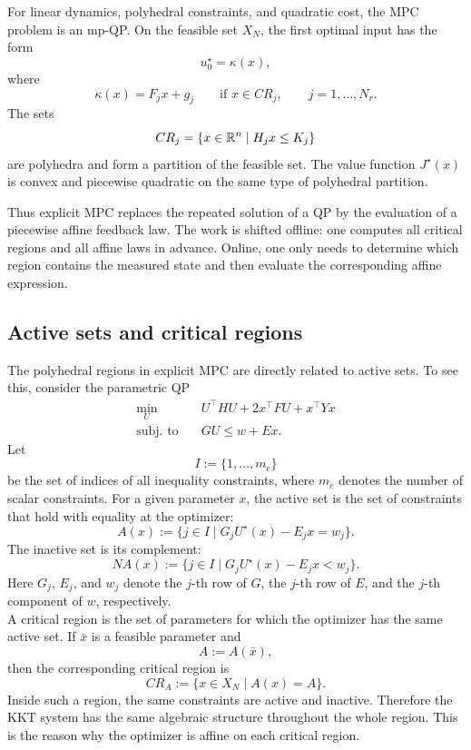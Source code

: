 \begin{theorembox}
For linear dynamics, polyhedral constraints, and quadratic cost, the MPC problem is an mp-QP.
On the feasible set \(X_N\), the first optimal input has the form
\[
    u_0^\star = \kappa(x),
\]
where
\[
    \kappa(x)=F_jx+g_j
    \qquad \text{if } x\in CR_j,
    \qquad j=1,\ldots,N_r .
\]
The sets
\[
    CR_j=\{x\in\mathbb{R}^n\mid H_jx\leq K_j\}
\]
are polyhedra and form a partition of the feasible set. The value function \(J^\star(x)\) is
convex and piecewise quadratic on the same type of polyhedral partition.
\end{theorembox}

Thus explicit MPC replaces the repeated solution of a QP by the evaluation of a piecewise affine
feedback law. The work is shifted offline: one computes all critical regions and all affine laws in
advance. Online, one only needs to determine which region contains the measured state and then
evaluate the corresponding affine expression.

\subsection{Active sets and critical regions}

The polyhedral regions in explicit MPC are directly related to active sets. To see this, consider
the parametric QP
\[
\begin{aligned}
    \min_U \quad
    & U^\top H U + 2x^\top F U + x^\top Yx
    \\
    \text{subj. to}\quad
    & GU \leq w + Ex.
\end{aligned}
\]
Let
\[
    I:=\{1,\ldots,m_c\}
\]
be the set of indices of all inequality constraints, where \(m_c\) denotes the number of scalar
constraints. For a given parameter \(x\), the active set is the set of constraints that hold with
equality at the optimizer:
\[
    A(x)
    :=
    \{j\in I \mid G_jU^\star(x)-E_jx=w_j\}.
\]
The inactive set is its complement:
\[
    NA(x)
    :=
    \{j\in I \mid G_jU^\star(x)-E_jx<w_j\}.
\]
Here \(G_j\), \(E_j\), and \(w_j\) denote the \(j\)-th row of \(G\), the \(j\)-th row of \(E\), and
the \(j\)-th component of \(w\), respectively.\\

A critical region is the set of parameters for which the optimizer has the same active set.
If \(\bar{x}\) is a feasible parameter and
\[
    A:=A(\bar{x}),
\]
then the corresponding critical region is
\[
    CR_A := \{x\in X_N \mid A(x)=A\}.
\]
Inside such a region, the same constraints are active and inactive. Therefore the KKT system has
the same algebraic structure throughout the whole region. This is the reason why the optimizer
is affine on each critical region.\\

